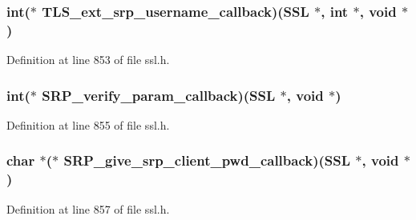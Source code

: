 \subsubsection[{\texorpdfstring{T\+L\+S\+\_\+ext\+\_\+srp\+\_\+username\+\_\+callback}{TLS_ext_srp_username_callback}}]{\setlength{\rightskip}{0pt plus 5cm}int($\ast$ T\+L\+S\+\_\+ext\+\_\+srp\+\_\+username\+\_\+callback)({\bf S\+SL} $\ast$, int $\ast$, {\bf void} $\ast$)}\hypertarget{structsrp__ctx__st_a0863b4e23705e67164270059403086a2}{}\label{structsrp__ctx__st_a0863b4e23705e67164270059403086a2}


Definition at line 853 of file ssl.\+h.

\subsubsection[{\texorpdfstring{S\+R\+P\+\_\+verify\+\_\+param\+\_\+callback}{SRP_verify_param_callback}}]{\setlength{\rightskip}{0pt plus 5cm}int($\ast$ S\+R\+P\+\_\+verify\+\_\+param\+\_\+callback)({\bf S\+SL} $\ast$, {\bf void} $\ast$)}\hypertarget{structsrp__ctx__st_ad70b5fe8ecacdddbcce2ae6f2bcc99f6}{}\label{structsrp__ctx__st_ad70b5fe8ecacdddbcce2ae6f2bcc99f6}


Definition at line 855 of file ssl.\+h.

\subsubsection[{\texorpdfstring{S\+R\+P\+\_\+give\+\_\+srp\+\_\+client\+\_\+pwd\+\_\+callback}{SRP_give_srp_client_pwd_callback}}]{\setlength{\rightskip}{0pt plus 5cm}char $\ast$($\ast$ S\+R\+P\+\_\+give\+\_\+srp\+\_\+client\+\_\+pwd\+\_\+callback)({\bf S\+SL} $\ast$, {\bf void} $\ast$)}\hypertarget{structsrp__ctx__st_a940baf63a8bc6e8f5704fac03dc9099b}{}\label{structsrp__ctx__st_a940baf63a8bc6e8f5704fac03dc9099b}


Definition at line 857 of file ssl.\+h.

